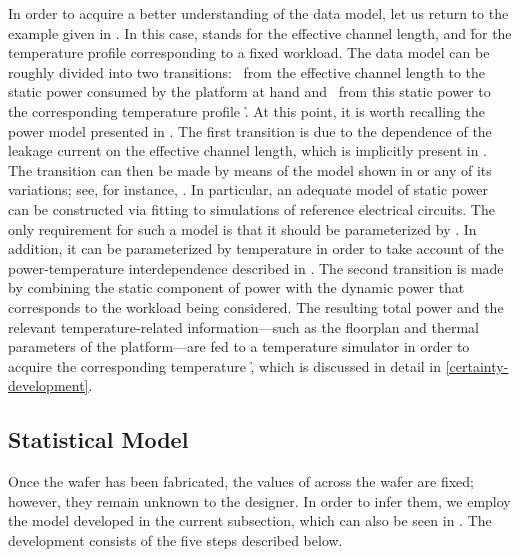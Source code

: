 In order to acquire a better understanding of the data model, let us return to
the example given in . In this case, \g stands for the
effective channel length, and \h for the temperature profile \mq corresponding
to a fixed workload. The data model can be roughly divided into two transitions:
\one~from the effective channel length \g to the static power consumed by the
platform at hand and \two~from this static power to the corresponding
temperature profile \h. At this point, it is worth recalling the power model
presented in . The first transition is due to the dependence
of the leakage current on the effective channel length, which is implicitly
present in . The transition can then be made by means of the
model shown in  or any of its variations; see, for instance,
\cite{chandrakasan2000, srivastava2010, yang2010, juan2012}. In particular, an
adequate model of static power can be constructed via fitting to 
simulations of reference electrical circuits. The only requirement for such a
model is that it should be parameterized by \g. In addition, it can be
parameterized by temperature in order to take account of the power-temperature
interdependence described in . The second transition is made
by combining the static component of power with the dynamic power that
corresponds to the workload being considered. The resulting total power and the
relevant temperature-related information---such as the floorplan and thermal
parameters of the platform---are fed to a temperature simulator in order to
acquire the corresponding temperature \h, which is discussed in detail in
\cref{certainty-development}.

\subsection{Statistical Model}

Once the wafer has been fabricated, the values of \g across the wafer are fixed;
however, they remain unknown to the designer. In order to infer them, we employ
the model developed in the current subsection, which can also be seen in
. The development consists of the five steps
described below.

